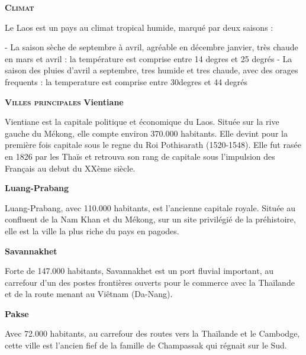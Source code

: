 \begin{multicols}{2}
\textbf{\textsc{Climat}}

Le Laos est un pays au climat tropical humide, marqué par deux saisons :

- La saison sèche de septembre à avril, agréable en décembre janvier, très chaude en mars et avril : la température est comprise entre 14 degres et 25 degrés
- La saison des pluies d’avril a septembre, tres humide et tres chaude, avec des orages frequents : la temperature est comprise entre 30degres et 44 degrés

\textbf{\textsc{Villes principales}}
\textbf{Vientiane}

Vientiane est la capitale politique et économique du Laos. Située sur la rive gauche du Mékong, elle compte environ 370.000 habitants. Elle devint pour la première fois capitale sous le regne du Roi Pothisarath (1520-1548). Elle fut rasée en 1826 par les Thaïs et retrouva son rang de capitale sous l’impulsion des Français au debut du XXème siècle.

\textbf{Luang-Prabang}

Luang-Prabang, avec 110.000 habitants, est l’ancienne capitale royale. Située au confluent de la Nam Khan et du Mékong, sur un site privilégié de la préhistoire, elle est la ville la plus riche du pays en pagodes.

\textbf{Savannakhet}

Forte de 147.000 habitants, Savannakhet est un port fluvial important, au carrefour d’un des postes frontières ouverts pour le commerce avec la Thaïlande et de la route menant au Viêtnam (Da-Nang).

\textbf{Pakse}

Avec 72.000 habitants, au carrefour des routes vers la Thaïlande et le Cambodge, cette ville est l’ancien fief de la famille de Champassak qui régnait sur le Sud.

\end{multicols}

